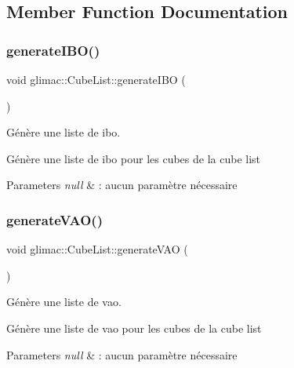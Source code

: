 \subsection{Member Function Documentation}
\mbox{\label{classglimac_1_1CubeList_a179fb745e2097440a88f6818a14a457e}} 
\subsubsection{\texorpdfstring{generate\+I\+B\+O()}{generateIBO()}}
{\footnotesize\ttfamily void glimac\+::\+Cube\+List\+::generate\+I\+BO (\begin{DoxyParamCaption}{ }\end{DoxyParamCaption})}



Génère une liste de ibo. 

Génère une liste de ibo pour les cubes de la cube list


\begin{DoxyParams}{Parameters}
{\em null} & \+: aucun paramètre nécessaire \\
\hline
\end{DoxyParams}
\mbox{\label{classglimac_1_1CubeList_a098351d44d9b56a3ca3f4643a0dec302}} 
\subsubsection{\texorpdfstring{generate\+V\+A\+O()}{generateVAO()}}
{\footnotesize\ttfamily void glimac\+::\+Cube\+List\+::generate\+V\+AO (\begin{DoxyParamCaption}{ }\end{DoxyParamCaption})}



Génère une liste de vao. 

Génère une liste de vao pour les cubes de la cube list


\begin{DoxyParams}{Parameters}
{\em null} & \+: aucun paramètre nécessaire \\
\hline
\end{DoxyParams}
\mbox{\label{classglimac_1_1CubeList_a7fc99dde6285a3b0ffc14b86f9844edc}} 
